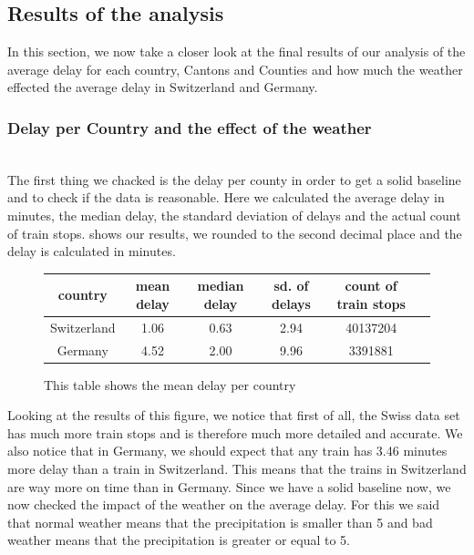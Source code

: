 \subsection*{Results of the analysis}

In this section, we now take a closer look at the final results of our analysis of the average delay for each country, Cantons and Counties
and how much the weather effected the average delay in Switzerland and Germany.

\subsubsection*{Delay per Country and the effect of the weather}\phantom{}\\
The first thing we chacked is the delay per county in order to get a solid baseline and to check if the data is reasonable.
Here we calculated the average delay in minutes, the median delay, the standard deviation of delays and the actual count of train stops.
 shows our results, we rounded to the second decimal place and the delay is calculated in minutes.
\begin{figure}[!ht]
    \centering
    \begin{tabular}{|c|c|c|c|c|c|}
        \hline
        country & mean delay & median delay & sd. of delays & count of train stops\\
        \hline
        Switzerland & 1.06 & 0.63 & 2.94 & 40137204 \\
        \hline
        Germany & 4.52 & 2.00 & 9.96 & 3391881 \\
        \hline
    \end{tabular}
    \caption{This table shows the mean delay per country}
    \label{fig:g5_country_delay}
\end{figure}
Looking at the results of this figure, we notice that first of all, the Swiss data set has much more train stops and is therefore
much more detailed and accurate.
We also notice that in Germany, we should expect that any train has 3.46 minutes more delay than a train in Switzerland.
This means that the trains in Switzerland are way more on time than in Germany. \newline \newline
Since we have a solid baseline now, we now checked the impact of the weather on the average delay.
For this we said that normal weather means that the precipitation is smaller than 5 and bad weather means that the precipitation is greater or equal to 5.

